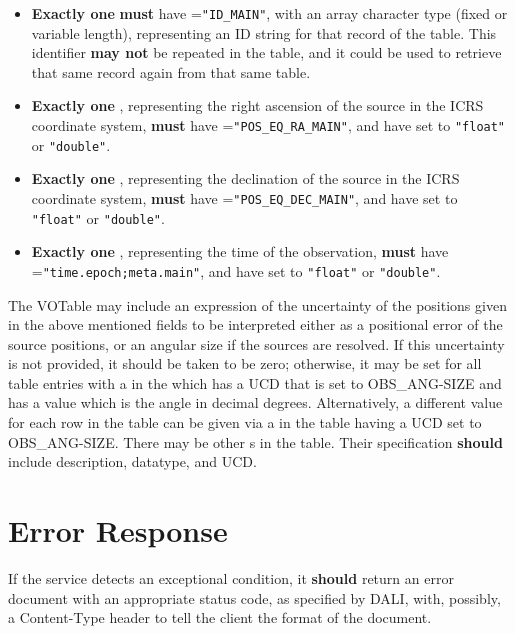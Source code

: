 \documentclass[11pt,a4paper]{ivoa}
\begin{document}
\begin{itemize}
	\item \textbf{Exactly one}  \textbf{must} have 
=\texttt{"ID\_MAIN"}, with an array character type (fixed or 
variable length), representing an ID string for that record of the table. 
This identifier \textbf{may not} be repeated in the table, and it could 
be used to retrieve that same record again from that same table.
	\item \textbf{Exactly one} , representing the right 
ascension of the source in the ICRS coordinate system, \textbf{must} 
have =\texttt{"POS\_EQ\_RA\_MAIN"}, and have  
set to \texttt{"float"} or \texttt{"double"}.
	\item \textbf{Exactly one} , representing the declination 
of the source in the ICRS coordinate system, \textbf{must} have 
=\texttt{"POS\_EQ\_DEC\_MAIN"}, and have  
set to \texttt{"float"} or \texttt{"double"}.
	\item \textbf{Exactly one} , representing the time of 
the observation, \textbf{must} have =\texttt{"time.epoch;meta.main"}, 
and have  set to \texttt{"float"} or \texttt{"double"}. 
\end{itemize}

The VOTable may include an expression of the uncertainty of the
positions given in the above mentioned fields to be interpreted either
as a positional error of the source positions, or an angular size if the
sources are resolved. If this uncertainty is not provided, it should be
taken to be zero; otherwise, it may be set for all table entries with a
 in the  which has a UCD that is set to
OBS\_ANG-SIZE and has a value which is
the angle in decimal degrees. Alternatively, a different value for each
row in the table can be given via a  in the table having a
UCD set to OBS\_ANG-SIZE.  There may be other s in the
table. Their specification \textbf{should} include description,
datatype, and UCD.

\section{Error Response} \label{sec:error}

If the service detects an exceptional condition, it \textbf{should}
return an error document with an appropriate status code, as specified
by DALI, with, possibly, a Content-Type header to tell the client the
format of the document.
\end{document}
